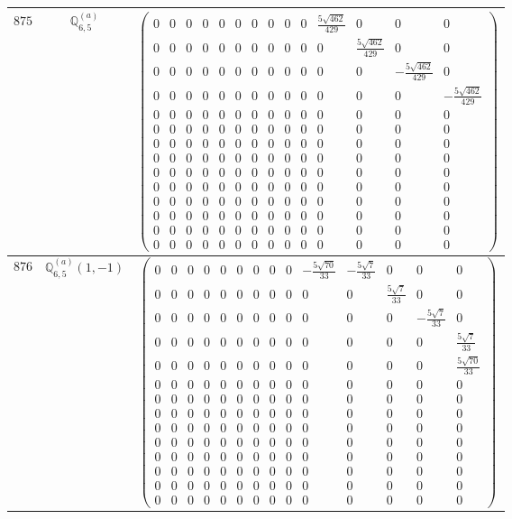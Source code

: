 \documentclass[fleqn,8pt,landscape]{jsarticle}
\begin{document}
\begin{center}
\begin{longtable}{ccc}
$ 875 $ & $ \mathbb{Q}_{6,5}^{(a)} $ & $ \begin{pmatrix} 0 & 0 & 0 & 0 & 0 & 0 & 0 & 0 & 0 & 0 & \frac{5 \sqrt{462}}{429} & 0 & 0 & 0 \\ 0 & 0 & 0 & 0 & 0 & 0 & 0 & 0 & 0 & 0 & 0 & \frac{5 \sqrt{462}}{429} & 0 & 0 \\ 0 & 0 & 0 & 0 & 0 & 0 & 0 & 0 & 0 & 0 & 0 & 0 & - \frac{5 \sqrt{462}}{429} & 0 \\ 0 & 0 & 0 & 0 & 0 & 0 & 0 & 0 & 0 & 0 & 0 & 0 & 0 & - \frac{5 \sqrt{462}}{429} \\ 0 & 0 & 0 & 0 & 0 & 0 & 0 & 0 & 0 & 0 & 0 & 0 & 0 & 0 \\ 0 & 0 & 0 & 0 & 0 & 0 & 0 & 0 & 0 & 0 & 0 & 0 & 0 & 0 \\ 0 & 0 & 0 & 0 & 0 & 0 & 0 & 0 & 0 & 0 & 0 & 0 & 0 & 0 \\ 0 & 0 & 0 & 0 & 0 & 0 & 0 & 0 & 0 & 0 & 0 & 0 & 0 & 0 \\ 0 & 0 & 0 & 0 & 0 & 0 & 0 & 0 & 0 & 0 & 0 & 0 & 0 & 0 \\ 0 & 0 & 0 & 0 & 0 & 0 & 0 & 0 & 0 & 0 & 0 & 0 & 0 & 0 \\ 0 & 0 & 0 & 0 & 0 & 0 & 0 & 0 & 0 & 0 & 0 & 0 & 0 & 0 \\ 0 & 0 & 0 & 0 & 0 & 0 & 0 & 0 & 0 & 0 & 0 & 0 & 0 & 0 \\ 0 & 0 & 0 & 0 & 0 & 0 & 0 & 0 & 0 & 0 & 0 & 0 & 0 & 0 \\ 0 & 0 & 0 & 0 & 0 & 0 & 0 & 0 & 0 & 0 & 0 & 0 & 0 & 0 \end{pmatrix} $ \\ \hline
$ 876 $ & $ \mathbb{Q}_{6,5}^{(a)}(1,-1) $ & $ \begin{pmatrix} 0 & 0 & 0 & 0 & 0 & 0 & 0 & 0 & 0 & - \frac{5 \sqrt{70}}{33} & - \frac{5 \sqrt{7}}{33} & 0 & 0 & 0 \\ 0 & 0 & 0 & 0 & 0 & 0 & 0 & 0 & 0 & 0 & 0 & \frac{5 \sqrt{7}}{33} & 0 & 0 \\ 0 & 0 & 0 & 0 & 0 & 0 & 0 & 0 & 0 & 0 & 0 & 0 & - \frac{5 \sqrt{7}}{33} & 0 \\ 0 & 0 & 0 & 0 & 0 & 0 & 0 & 0 & 0 & 0 & 0 & 0 & 0 & \frac{5 \sqrt{7}}{33} \\ 0 & 0 & 0 & 0 & 0 & 0 & 0 & 0 & 0 & 0 & 0 & 0 & 0 & \frac{5 \sqrt{70}}{33} \\ 0 & 0 & 0 & 0 & 0 & 0 & 0 & 0 & 0 & 0 & 0 & 0 & 0 & 0 \\ 0 & 0 & 0 & 0 & 0 & 0 & 0 & 0 & 0 & 0 & 0 & 0 & 0 & 0 \\ 0 & 0 & 0 & 0 & 0 & 0 & 0 & 0 & 0 & 0 & 0 & 0 & 0 & 0 \\ 0 & 0 & 0 & 0 & 0 & 0 & 0 & 0 & 0 & 0 & 0 & 0 & 0 & 0 \\ 0 & 0 & 0 & 0 & 0 & 0 & 0 & 0 & 0 & 0 & 0 & 0 & 0 & 0 \\ 0 & 0 & 0 & 0 & 0 & 0 & 0 & 0 & 0 & 0 & 0 & 0 & 0 & 0 \\ 0 & 0 & 0 & 0 & 0 & 0 & 0 & 0 & 0 & 0 & 0 & 0 & 0 & 0 \\ 0 & 0 & 0 & 0 & 0 & 0 & 0 & 0 & 0 & 0 & 0 & 0 & 0 & 0 \\ 0 & 0 & 0 & 0 & 0 & 0 & 0 & 0 & 0 & 0 & 0 & 0 & 0 & 0 \end{pmatrix} $ \\ \hline

\end{longtable}
\end{center}
\end{document}
